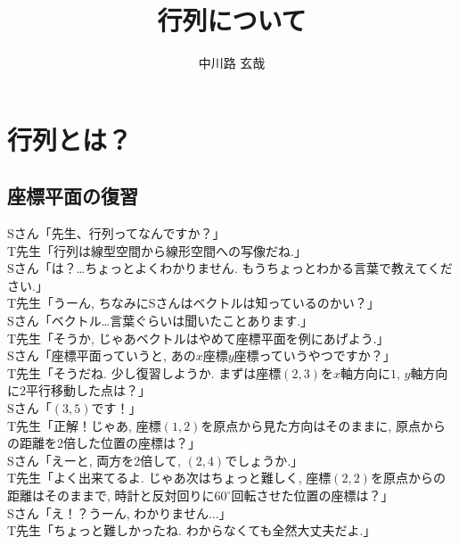 \documentclass[a4paper,12pt]{jreport}
\title{行列について}
\author{中川路 玄哉}
\theoremstyle{definition}
\newcommand{\ang}[1]{#1^\circ}
\begin{document}
   \maketitle
   \tableofcontents
   \chapter{行列とは？}
   \section{座標平面の復習}\label{coordinate}
   Sさん「先生、行列ってなんですか？」\\

   T先生「行列は線型空間から線形空間への写像だね.」\\
   
   Sさん「は？…ちょっとよくわかりません. もうちょっとわかる言葉で教えてください.」\\

   T先生「うーん, ちなみにSさんはベクトルは知っているのかい？」\\

   Sさん「ベクトル…言葉ぐらいは聞いたことあります.」\\

   T先生「そうか, じゃあベクトルはやめて座標平面を例にあげよう.」\\

   Sさん「座標平面っていうと, あの$x$座標$y$座標っていうやつですか？」\\

   T先生「そうだね. 少し復習しようか. まずは座標$(2, 3)$を$x$軸方向に$1$, $y$軸方向に$2$平行移動した点は？」\\

   Sさん「$(3, 5)$です！」\\

   T先生「正解！じゃあ, 座標$(1, 2)$を原点から見た方向はそのままに, 原点からの距離を2倍した位置の座標は？」\\

   Sさん「えーと, 両方を2倍して, $(2, 4)$でしょうか.」\\

   T先生「よく出来てるよ. じゃあ次はちょっと難しく, 座標$(2,2)$を原点からの距離はそのままで, 時計と反対回りに$\ang{60}$回転させた位置の座標は？」\\

   Sさん「え！？うーん, わかりません...」\\

   T先生「ちょっと難しかったね. わからなくても全然大丈夫だよ.」\\
\end{document}
